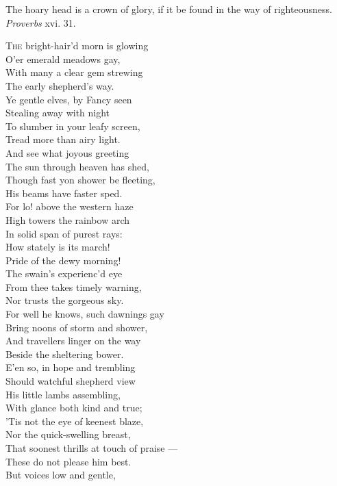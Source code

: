 The hoary head is a crown of glory, if it be found in the way of righteousness. \emph{Proverbs} xvi. 31.

\textsc{The} bright-hair’d morn is glowing \\
 O’er emerald meadows gay, \\
 With many a clear gem strewing \\
 The early shepherd’s way. \\
 Ye gentle elves, by Fancy seen \\
 Stealing away with night \\
 To slumber in your leafy screen, \\
 Tread more than airy light. \\
  And see what joyous greeting \\
 The sun through heaven has shed, \\
 Though fast yon shower be fleeting, \\
 His beams have faster sped. \\
 For lo! above the western haze \\
 High towers the rainbow arch \\
 In solid span of purest rays: \\
 How stately is its march! \\
  Pride of the dewy morning! \\
 The swain’s experienc’d eye \\
 From thee takes timely warning, \\
 Nor trusts the gorgeous sky. \\
 For well he knows, such dawnings gay \\
 Bring noons of storm and shower, \\
 And travellers linger on the way \\
 Beside the sheltering bower. \\
  E’en so, in hope and trembling \\
 Should watchful shepherd view \\
 His little lambs assembling, \\
 With glance both kind and true; \\
 ’Tis not the eye of keenest blaze, \\
 Nor the quick-swelling breast, \\
 That soonest thrills at touch of praise — \\
 These do not please him best. \\
  But voices low and gentle, \\
